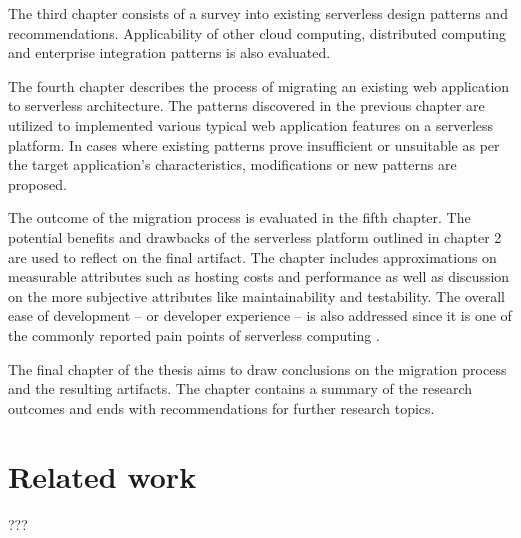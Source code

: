 The third chapter consists of a survey into existing serverless design patterns and recommendations. Applicability of other cloud computing, distributed computing and enterprise integration patterns is also evaluated.

The fourth chapter describes the process of migrating an existing web application to serverless architecture. The patterns discovered in the previous chapter are utilized to implemented various typical web application features on a serverless platform. In cases where existing patterns prove insufficient or unsuitable as per the target application's characteristics, modifications or new patterns are proposed.

The outcome of the migration process is evaluated in the fifth chapter. The potential benefits and drawbacks of the serverless platform outlined in chapter 2 are used to reflect on the final artifact. The chapter includes approximations on measurable attributes such as hosting costs and performance as well as discussion on the more subjective attributes like maintainability and testability. The overall ease of development -- or developer experience -- is also addressed since it is one of the commonly reported pain points of serverless computing \parencite{van2017spec}.

The final chapter of the thesis aims to draw conclusions on the migration process and the resulting artifacts. The chapter contains a summary of the research outcomes and ends with recommendations for further research topics.

\section{Related work}

???
